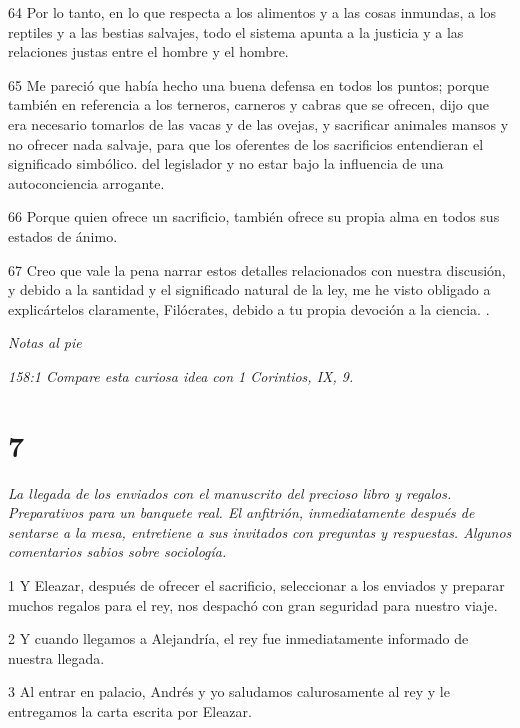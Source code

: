 \par 64 Por lo tanto, en lo que respecta a los alimentos y a las cosas inmundas, a los reptiles y a las bestias salvajes, todo el sistema apunta a la justicia y a las relaciones justas entre el hombre y el hombre.

\par 65 Me pareció que había hecho una buena defensa en todos los puntos; porque también en referencia a los terneros, carneros y cabras que se ofrecen, dijo que era necesario tomarlos de las vacas y de las ovejas, y sacrificar animales mansos y no ofrecer nada salvaje, para que los oferentes de los sacrificios entendieran el significado simbólico. del legislador y no estar bajo la influencia de una autoconciencia arrogante.

\par 66 Porque quien ofrece un sacrificio, también ofrece su propia alma en todos sus estados de ánimo.

\par 67 Creo que vale la pena narrar estos detalles relacionados con nuestra discusión, y debido a la santidad y el significado natural de la ley, me he visto obligado a explicártelos claramente, Filócrates, debido a tu propia devoción a la ciencia. .

\par \textit{Notas al pie}

\par \textit{158:1 Compare esta curiosa idea con 1 Corintios, IX, 9.}

\chapter{7}

\par \textit{La llegada de los enviados con el manuscrito del precioso libro y regalos. Preparativos para un banquete real. El anfitrión, inmediatamente después de sentarse a la mesa, entretiene a sus invitados con preguntas y respuestas. Algunos comentarios sabios sobre sociología.}

\par 1 Y Eleazar, después de ofrecer el sacrificio, seleccionar a los enviados y preparar muchos regalos para el rey, nos despachó con gran seguridad para nuestro viaje.

\par 2 Y cuando llegamos a Alejandría, el rey fue inmediatamente informado de nuestra llegada.

\par 3 Al entrar en palacio, Andrés y yo saludamos calurosamente al rey y le entregamos la carta escrita por Eleazar.


